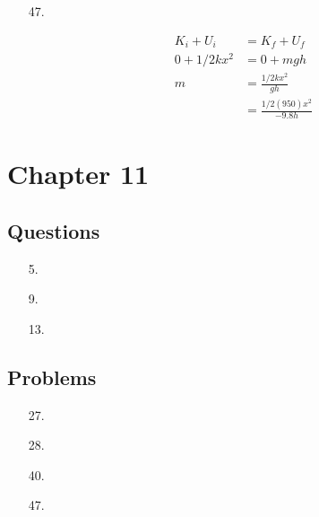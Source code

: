 \begin{itemize}
        \item [47.]
        
        \begin{center}
        \end{center}

        \begin{align*}
            K_{i} + U_{i}   & = K_{f} + U_{f}   \\
            0 + 1/2kx^{2}   & = 0 + mgh         \\
            m               & = \frac{1/2kx^{2}}
                                     {gh}       \\
                            & = \frac{1/2(950)x^{2}}
                                     {-9.8h}
        \end{align*}

    \end{itemize}

    \pagebreak

    \section*{Chapter 11}

    \subsection*{Questions}

    \begin{itemize}
        \item [5.]
        \item [9.]
        \item [13.]
    \end{itemize}

    \subsection*{Problems}

    \begin{itemize}
        \item [27.]
        \item [28.]
        \item [40.]
        \item [47.]
    \end{itemize}

